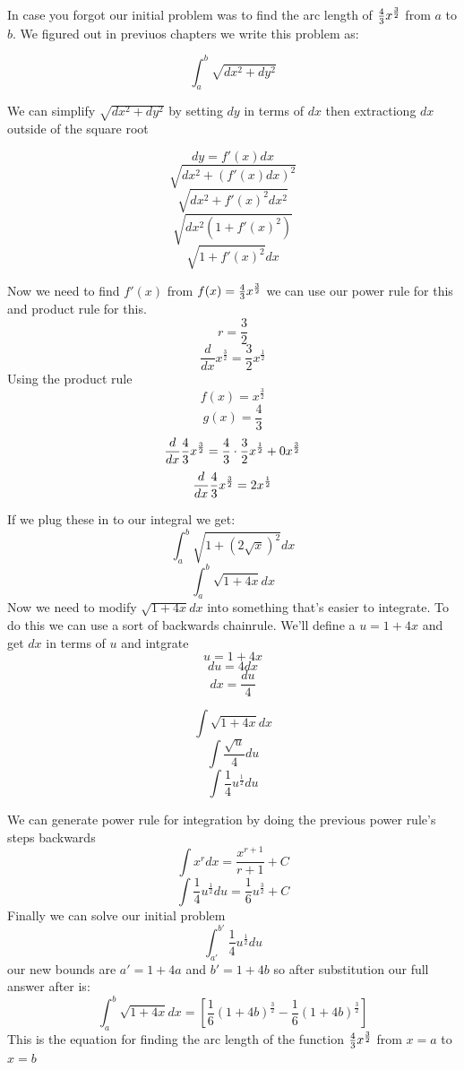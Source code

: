 \documentclass[12pt]{book}
\begin{document}
In case you forgot our initial problem was to find the arc length of $\frac{4}{3}x^{\frac{3}{2}}$ from $a$ to $b$. We figured out in previuos chapters we write this problem as:

$$\int_{a}^{b} \sqrt{dx^2 + dy^2}$$

We can simplify $\sqrt{dx^2 + dy^2}$ by setting $dy$ in terms of $dx$ then extractiong $dx$ outside of the square root

$$ dy = f'(x)dx $$
$$\sqrt{dx^2 + (f'(x)dx)^2}$$
$$\sqrt{dx^2 + f'(x)^2dx^2}$$
$$\sqrt{dx^2 (1 + f'(x)^2)}$$
$$\sqrt{1 + f'(x)^2}dx $$

Now we need to find $f'(x)$ from $f(x) = \frac{4}{3}x^{\frac{3}{2}}$ we can use our power rule for this and product rule for this.
$$r = \frac{3}{2}$$
$$\frac{d}{dx} x ^{\frac{3}{2}} = \frac{3}{2}x^{\frac{1}{2}}$$
Using the product rule
$$f(x) = x ^{\frac{3}{2}}$$
$$g(x) = \frac{4}{3}$$
$$\frac{d}{dx}\frac{4}{3}x^{\frac{3}{2}} = \frac{4}{3} \cdot \frac{3}{2}x ^{\frac{1}{2}} + 0x^\frac{3}{2}$$
$$\frac{d}{dx}\frac{4}{3}x^{\frac{3}{2}} = 2x^\frac{1}{2}$$

If we plug these in to our integral we get:
$$\int_{a}^{b} \sqrt{1 + (2\sqrt{x})^2}dx$$
$$\int_{a}^{b} \sqrt{1 + 4x}dx$$
Now we need to modify $\sqrt{1 + 4x}dx$ into something that's easier to integrate. To do this we can use a sort of backwards chainrule. We'll define a $u = 1+4x$ and get $dx$ in terms of $u$ and intgrate
$$u = 1+4x$$
$$du = 4dx$$
$$dx = \frac{du}{4}$$

$$\int \sqrt{1+4x}dx$$
$$\int \frac{\sqrt{u}}{4}du$$
$$\int \frac{1}{4}u^{\frac{1}{2}}du$$

We can generate power rule for integration by doing the previous power rule's steps backwards
$$\int x^rdx = \frac{x^{r+1}}{r+1} + C$$
$$\int \frac{1}{4}u^{\frac{1}{2}}du = \frac{1}{6}u^{\frac{3}{2}} + C$$
Finally we can solve our initial problem
$$\int_ {a'}^{b'} \frac{1}{4}u^{\frac{1}{2}}du$$
our new bounds are $a' = 1+4a$ and $b' = 1+4b$ so after substitution our full answer after is:
$$\int_{a}^{b} \sqrt{1 + 4x}dx = [\frac{1}{6}(1+4b)^{\frac{3}{2}}-\frac{1}{6}(1+4b)^{\frac{3}{2}}]$$
This is the equation for finding the arc length of the function $\frac{4}{3}x^{\frac{3}{2}}$ from $x=a$ to $x=b$
\end{document}
